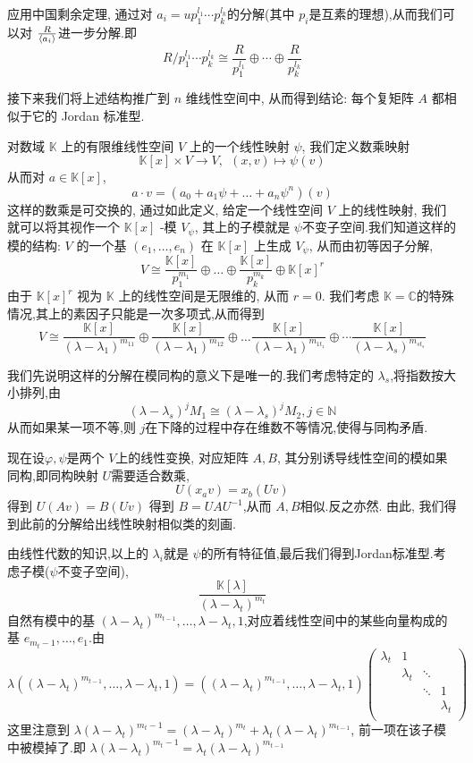 \documentclass[12pt, a4paper,oneside, UTF8]{ctexart}
\theoremstyle{definition}
\theoremstyle{plain}
\begin{document}
应用中国剩余定理, 通过对 $a_{i} = up_1^{l_{1}}\cdots p^{l_{k}}_{k}$的分解(其中 $p _{i}$是互素的理想),从而我们可以对 $\frac{R}{\braket{a_i}}$进一步分解.即
\[
R / p_1^{l_{1}}\cdots p^{l_{k}}_{k} \cong \frac{R}{p_1^{l_1}}\oplus \cdots \oplus \frac{R}{p_{k}^{l_{k}}}
\]
\vspace*{3em}


接下来我们将上述结构推广到 $n$ 维线性空间中, 从而得到结论: 每个复矩阵 $A$ 都相似于它的 Jordan 标准型.

对数域 $\mathbb{K}$ 上的有限维线性空间 $V$ 上的一个线性映射 $\psi$, 我们定义数乘映射
$$\mathbb{K}[x]\times V \to  V, \ \ (x,v) \mapsto \psi(v)$$
从而对 $a \in \mathbb{K}[x]$, 
$$a \cdot v = (a_{0} +a_{1}\psi+\dots+a_{n}\psi^{n})(v)$$
这样的数乘是可交换的, 通过如此定义, 给定一个线性空间 $V$ 上的线性映射, 我们就可以将其视作一个 $\mathbb{K}[x]$ -模 $V_{\psi}$,  其上的子模就是 $\psi$不变子空间.我们知道这样的模的结构:  $V$ 的一个基 $(e_{1},\dots,e_{n})$ 在 $\mathbb{K}[x]$ 上生成 $V_{\psi}$, 从而由初等因子分解, 
$$V \cong \frac{\mathbb{K}[x]}{p_{1}^{m_{1}}} \oplus \dots \oplus \frac{\mathbb{K}[x]}{p_{k}^{m_{k}}}\oplus \mathbb{K}[x]^{r}$$
由于 $\mathbb{K}[x]^{r}$ 视为 $\mathbb{K}$ 上的线性空间是无限维的, 从而 $r = 0$. 我们考虑 $\mathbb{K} = \mathbb{C}$的特殊情况,其上的素因子只能是一次多项式,从而得到
\[
V \cong \frac{\mathbb{K}[x]}{(\lambda-\lambda_1)^{m_{11}}} \oplus \frac{\mathbb{K}[x]}{(\lambda-\lambda_1)^{m_{12}}} \oplus \dots\frac{\mathbb{K}[x]}{(\lambda-\lambda_1)^{m_{1t_{1}}}}  \oplus \cdots\frac{\mathbb{K}[x]}{(\lambda-\lambda_{s})^{m_{st_{s}}}}
\]

我们先说明这样的分解在模同构的意义下是唯一的.我们考虑特定的 $\lambda_{s}$,将指数按大小排列,由
\[
(\lambda - \lambda_{s})^{j}M_1 \cong (\lambda - \lambda_{s})^{j}M_2, j\in \mathbb{N}
\]
从而如果某一项不等,则 $j$在下降的过程中存在维数不等情况,使得与同构矛盾.


 现在设$\varphi,\psi$是两个 $V$上的线性变换, 对应矩阵 $A,B$, 其分别诱导线性空间的模如果同构,即同构映射 $U$需要适合数乘,
\[
U(x_{a}v) = x_{b}(Uv) 
\]
得到 $ U(Av) = B(Uv)$
得到 $B = UAU^{-1}$,从而 $A,B$相似.反之亦然. 由此, 我们得到此前的分解给出线性映射相似类的刻画.

由线性代数的知识,以上的 $\lambda_{i}$就是 $\psi$的所有特征值,最后我们得到Jordan标准型.考虑子模($\psi$不变子空间),
\[
    \frac{\mathbb{K}[\lambda]}{(\lambda-\lambda_t)^{m_{t}}}
\]
自然有模中的基 $(\lambda-\lambda_t)^{m_{t-1}}, \ldots ,\lambda-\lambda_{t}, 1$,对应着线性空间中的某些向量构成的基 $e_{m_{t}-1}, \ldots ,e_{1}$.由
\[
\lambda((\lambda-\lambda_t)^{m_{t-1}}, \ldots ,\lambda-\lambda_{t}, 1) = ((\lambda-\lambda_t)^{m_{t-1}}, \ldots ,\lambda-\lambda_{t}, 1)\begin{pmatrix} \lambda_{t} & 1 &  &  \\  & \lambda_{t} & \ddots &  \\  &  &  \ddots&  1\\  &  &  & \lambda_{t} \\\end{pmatrix}
\]
这里注意到 $\lambda (\lambda-\lambda_t)^{m_{t}-1} = (\lambda-\lambda_{t})^{m_{t}} +\lambda_{t} (\lambda- \lambda_t)^{m_{t-1}} $, 前一项在该子模中被模掉了.即 $\lambda (\lambda-\lambda_t)^{m_{t}-1} = \lambda_{t} (\lambda- \lambda_t)^{m_{t-1}}$
\end{document}
